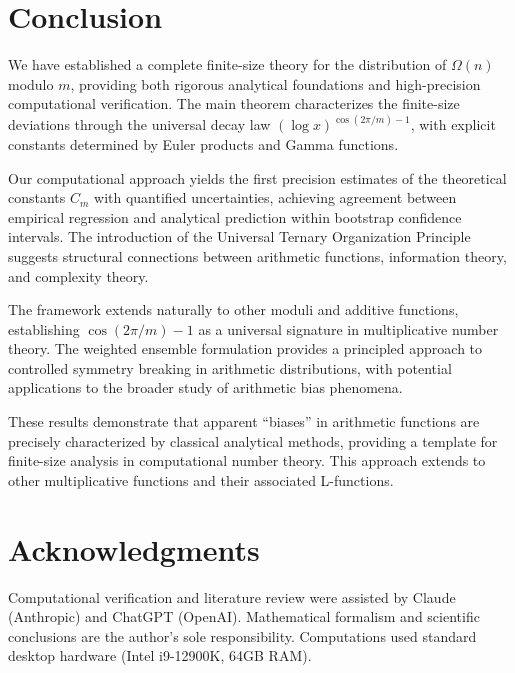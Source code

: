 \documentclass[12pt]{article}
\theoremstyle{definition}
\theoremstyle{remark}
\begin{document}
\section{Conclusion}

We have established a complete finite-size theory for the distribution of $\Omega(n)$ modulo $m$, providing both rigorous analytical foundations and high-precision computational verification. The main theorem characterizes the finite-size deviations through the universal decay law $(\log x)^{\cos(2\pi/m) - 1}$, with explicit constants determined by Euler products and Gamma functions.

Our computational approach yields the first precision estimates of the theoretical constants $C_m$ with quantified uncertainties, achieving agreement between empirical regression and analytical prediction within bootstrap confidence intervals. The introduction of the Universal Ternary Organization Principle suggests structural connections between arithmetic functions, information theory, and complexity theory.

The framework extends naturally to other moduli and additive functions, establishing $\cos(2\pi/m) - 1$ as a universal signature in multiplicative number theory. The weighted ensemble formulation provides a principled approach to controlled symmetry breaking in arithmetic distributions, with potential applications to the broader study of arithmetic bias phenomena.

These results demonstrate that apparent ``biases'' in arithmetic functions are precisely characterized by classical analytical methods, providing a template for finite-size analysis in computational number theory. This approach extends to other multiplicative functions and their associated L-functions.

\section*{Acknowledgments}

Computational verification and literature review were assisted by Claude (Anthropic) and ChatGPT (OpenAI). Mathematical formalism and scientific conclusions are the author's sole responsibility. Computations used standard desktop hardware (Intel i9-12900K, 64GB RAM).



\end{document}
